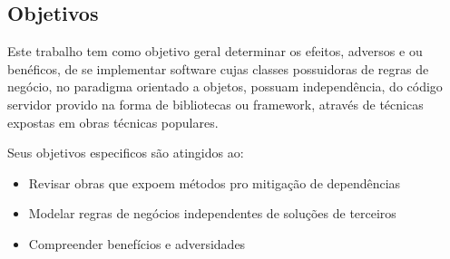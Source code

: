 

\subsection{\textbf{Objetivos}}
    \label{sec:objetivos}

    Este trabalho tem como objetivo geral determinar os efeitos, adversos
    e ou benéficos, de se implementar software cujas classes possuidoras
    de regras de negócio, no paradigma orientado a objetos, possuam
    independência, do código servidor provido na forma de bibliotecas ou
    framework, através de técnicas expostas em obras técnicas populares.

    Seus objetivos especificos são atingidos ao:

    \begin{itemize}
      \item{Revisar obras que expoem métodos pro mitigação de dependências}
      \item{Modelar regras de negócios independentes de soluções de terceiros}
      \item{Compreender benefícios e adversidades}
    \end{itemize}

